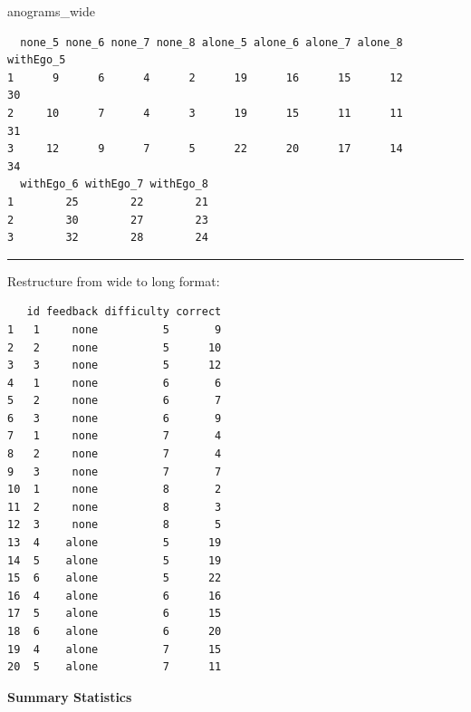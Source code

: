 \documentclass[]{article}
\newenvironment{Shaded}{\begin{snugshade}}{\end{snugshade}}
\newcommand{\NormalTok}[1]{#1}
\begin{document}
\begin{Shaded}
\begin{Highlighting}[]
\NormalTok{anograms_wide}
\end{Highlighting}
\end{Shaded}

\begin{verbatim}
  none_5 none_6 none_7 none_8 alone_5 alone_6 alone_7 alone_8 withEgo_5
1      9      6      4      2      19      16      15      12        30
2     10      7      4      3      19      15      11      11        31
3     12      9      7      5      22      20      17      14        34
  withEgo_6 withEgo_7 withEgo_8
1        25        22        21
2        30        27        23
3        32        28        24
\end{verbatim}

\begin{center}\rule{0.5\linewidth}{\linethickness}\end{center}

Restructure from wide to long format:

\begin{verbatim}
   id feedback difficulty correct
1   1     none          5       9
2   2     none          5      10
3   3     none          5      12
4   1     none          6       6
5   2     none          6       7
6   3     none          6       9
7   1     none          7       4
8   2     none          7       4
9   3     none          7       7
10  1     none          8       2
11  2     none          8       3
12  3     none          8       5
13  4    alone          5      19
14  5    alone          5      19
15  6    alone          5      22
16  4    alone          6      16
17  5    alone          6      15
18  6    alone          6      20
19  4    alone          7      15
20  5    alone          7      11
\end{verbatim}

\clearpage

\textbf{Summary Statistics}
\end{document}
